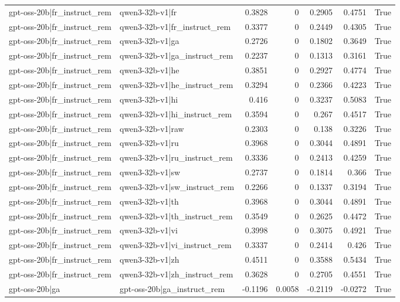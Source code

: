 \begin{table}
\begin{tabular}{l l r r r r l}
gpt-oss-20b|fr_instruct_rem & qwen3-32b-v1|fr & 0.3828 & 0 & 0.2905 & 0.4751 & True \\
gpt-oss-20b|fr_instruct_rem & qwen3-32b-v1|fr_instruct_rem & 0.3377 & 0 & 0.2449 & 0.4305 & True \\
gpt-oss-20b|fr_instruct_rem & qwen3-32b-v1|ga & 0.2726 & 0 & 0.1802 & 0.3649 & True \\
gpt-oss-20b|fr_instruct_rem & qwen3-32b-v1|ga_instruct_rem & 0.2237 & 0 & 0.1313 & 0.3161 & True \\
gpt-oss-20b|fr_instruct_rem & qwen3-32b-v1|he & 0.3851 & 0 & 0.2927 & 0.4774 & True \\
gpt-oss-20b|fr_instruct_rem & qwen3-32b-v1|he_instruct_rem & 0.3294 & 0 & 0.2366 & 0.4223 & True \\
gpt-oss-20b|fr_instruct_rem & qwen3-32b-v1|hi & 0.416 & 0 & 0.3237 & 0.5083 & True \\
gpt-oss-20b|fr_instruct_rem & qwen3-32b-v1|hi_instruct_rem & 0.3594 & 0 & 0.267 & 0.4517 & True \\
gpt-oss-20b|fr_instruct_rem & qwen3-32b-v1|raw & 0.2303 & 0 & 0.138 & 0.3226 & True \\
gpt-oss-20b|fr_instruct_rem & qwen3-32b-v1|ru & 0.3968 & 0 & 0.3044 & 0.4891 & True \\
gpt-oss-20b|fr_instruct_rem & qwen3-32b-v1|ru_instruct_rem & 0.3336 & 0 & 0.2413 & 0.4259 & True \\
gpt-oss-20b|fr_instruct_rem & qwen3-32b-v1|sw & 0.2737 & 0 & 0.1814 & 0.366 & True \\
gpt-oss-20b|fr_instruct_rem & qwen3-32b-v1|sw_instruct_rem & 0.2266 & 0 & 0.1337 & 0.3194 & True \\
gpt-oss-20b|fr_instruct_rem & qwen3-32b-v1|th & 0.3968 & 0 & 0.3044 & 0.4891 & True \\
gpt-oss-20b|fr_instruct_rem & qwen3-32b-v1|th_instruct_rem & 0.3549 & 0 & 0.2625 & 0.4472 & True \\
gpt-oss-20b|fr_instruct_rem & qwen3-32b-v1|vi & 0.3998 & 0 & 0.3075 & 0.4921 & True \\
gpt-oss-20b|fr_instruct_rem & qwen3-32b-v1|vi_instruct_rem & 0.3337 & 0 & 0.2414 & 0.426 & True \\
gpt-oss-20b|fr_instruct_rem & qwen3-32b-v1|zh & 0.4511 & 0 & 0.3588 & 0.5434 & True \\
gpt-oss-20b|fr_instruct_rem & qwen3-32b-v1|zh_instruct_rem & 0.3628 & 0 & 0.2705 & 0.4551 & True \\
gpt-oss-20b|ga & gpt-oss-20b|ga_instruct_rem & -0.1196 & 0.0058 & -0.2119 & -0.0272 & True \\

\end{tabular}
\end{table}

